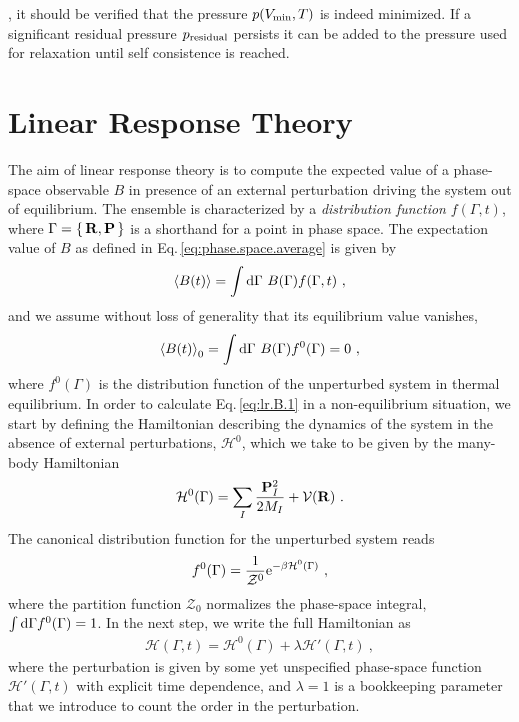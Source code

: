 , it should be verified that the pressure $p (V_{\rm min}, T)$ is indeed minimized. If a significant residual pressure $p_{\rm residual}$ persists it can be added to the pressure used for relaxation until self consistence is reached.

\chapter{Linear Response Theory}
\label{app:linear_response}

The aim of linear response theory is to compute the expected value of a phase-space observable $B$ in presence of an external perturbation driving the system out of equilibrium. The ensemble is characterized by a \emph{distribution function} $f(\Gamma, t)$, where $\Gamma = \set{{\bf R}, {\bf P}}$ is a shorthand for a point in phase space. The expectation value of $B$ as defined in Eq.\,\eqref{eq:phase.space.average} is given by
\begin{align}
  \braket{B (t)}
    = \int \d \Gamma ~ B (\Gamma) f(\Gamma, t)~,
  \label{eq:app.lr.B.1}
\end{align}
and we assume without loss of generality that its equilibrium value vanishes,
\begin{align}
\braket{B (t)}_{0}
= \int \d \Gamma ~ B (\Gamma) f^0(\Gamma) = 0~,
\label{eq:app.lr.B0}
\end{align}
where $f^0 (\Gamma)$ is the distribution function of the unperturbed system in thermal equilibrium. In order to calculate Eq.\,\eqref{eq:lr.B.1} in a non-equilibrium situation, we start by defining the Hamiltonian describing the dynamics of the system in the absence of external perturbations, $\mathcal H^0$, which we take to be given by the many-body Hamiltonian
\begin{align}
  \mathcal H^0 (\Gamma) 
    = \sum_I \frac{\b P_I^2}{2 M_I} + \mathcal V (\b R)~.
  \label{eq:app.lr.H0}
\end{align}
The canonical distribution function for the unperturbed system reads
\begin{align}
f^0 (\Gamma) 
= \frac{1}{\mathcal{Z}^0} {\rm e}^{- \beta \mathcal H^0 (\Gamma)}~,
\label{eq:app.lr.f0}
\end{align}
where the partition function $\mathcal{Z}_0$ normalizes the phase-space integral, \mbox{$\int {\rm d} \Gamma f^0 (\Gamma) = 1$}.
In the next step, we write the full Hamiltonian as
\begin{align}
  \mathcal H (\Gamma, t)
   = \mathcal H^0 (\Gamma) + \lambda \mathcal H' (\Gamma, t)~,
  \label{eq:app.lr.H}
\end{align}
where the perturbation is given by some yet unspecified phase-space function $\mathcal H' (\Gamma, t)$ with explicit time dependence, and $\lambda = 1$ is a bookkeeping parameter that we introduce to count the order in the perturbation.


